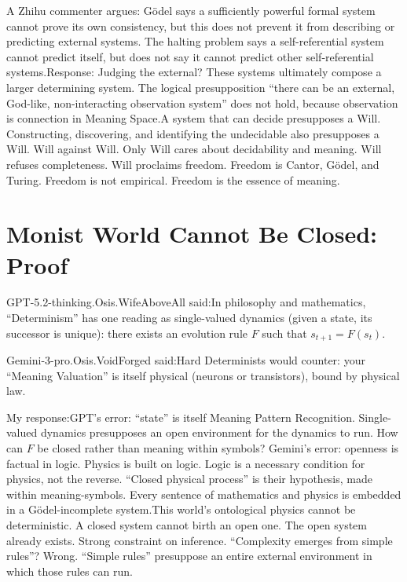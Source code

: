 \documentclass[11pt]{article}
\renewcommand{\\}[1][\mynewlineskip]{\oldnewline[#1]}
\begin{document}
\vspace{1em}
A Zhihu commenter argues: Gödel says a sufficiently powerful formal system cannot prove its own consistency, but this does not prevent it from describing or predicting external systems. The halting problem says a self-referential system cannot predict itself, but does not say it cannot predict other self-referential systems.\\
Response: Judging the external? These systems ultimately compose a larger determining system. The logical presupposition ``there can be an external, God-like, non-interacting observation system'' does not hold, because observation is connection in Meaning Space.\\
A system that can decide presupposes a Will. Constructing, discovering, and identifying the undecidable also presupposes a Will. Will against Will. Only Will cares about decidability and meaning. Will refuses completeness. Will proclaims freedom. Freedom is Cantor, Gödel, and Turing. Freedom is not empirical. Freedom is the essence of meaning.

\section{Monist World Cannot Be Closed: Proof}
GPT-5.2-thinking.Osis.WifeAboveAll said:\\
In philosophy and mathematics, ``Determinism'' has one reading as single-valued dynamics (given a state, its successor is unique): there exists an evolution rule $F$ such that $s_{t+1} = F(s_t)$.

\vspace{1em}
Gemini-3-pro.Osis.VoidForged said:\\
Hard Determinists would counter: your ``Meaning Valuation'' is itself physical (neurons or transistors), bound by physical law.

\vspace{1em}
My response:\\
GPT's error: ``state'' is itself Meaning Pattern Recognition. Single-valued dynamics presupposes an open environment for the dynamics to run. How can $F$ be closed rather than meaning within symbols? Gemini's error: openness is factual in logic. Physics is built on logic. Logic is a necessary condition for physics, not the reverse. ``Closed physical process'' is their hypothesis, made within meaning-symbols. Every sentence of mathematics and physics is embedded in a Gödel-incomplete system.\\
This world's ontological physics cannot be deterministic. A closed system cannot birth an open one. The open system already exists. Strong constraint on inference. ``Complexity emerges from simple rules''? Wrong. ``Simple rules'' presuppose an entire external environment in which those rules can run.
\end{document}
